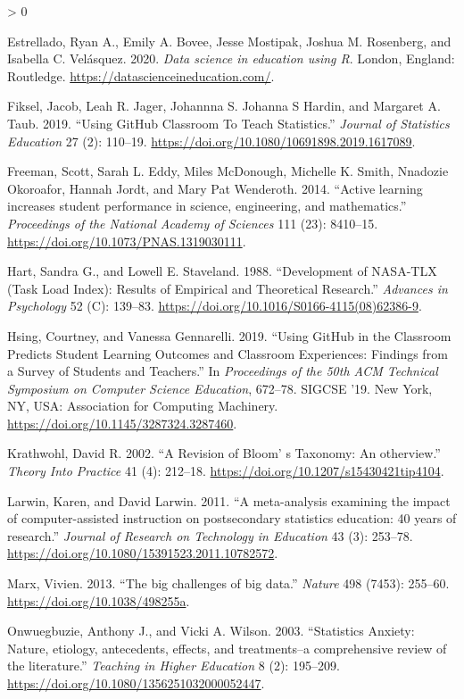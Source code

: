 \documentclass[
]{article}
\newlength{\cslhangindent}
\newenvironment{CSLReferences}[2] %
 {%
  \setlength{\parindent}{0pt}
  \ifodd #1 \everypar{\setlength{\hangindent}{\cslhangindent}}\ignorespaces\fi
  \ifnum #2 > 0
  \setlength{\parskip}{#2\baselineskip}
  \fi
 }%
 {}
\begin{document}
\begin{CSLReferences}{1}{0}
\leavevmode\hypertarget{ref-Estrellado2020}{}%
Estrellado, Ryan A., Emily A. Bovee, Jesse Mostipak, Joshua M.
Rosenberg, and Isabella C. Velásquez. 2020. \emph{{Data science in
education using R}}. London, England: Routledge.
\url{https://datascienceineducation.com/}.

\leavevmode\hypertarget{ref-Fiksel2019}{}%
Fiksel, Jacob, Leah R. Jager, Johannna S. Johanna S Hardin, and Margaret
A. Taub. 2019. {``{Using GitHub Classroom To Teach Statistics}.''}
\emph{Journal of Statistics Education} 27 (2): 110--19.
\url{https://doi.org/10.1080/10691898.2019.1617089}.

\leavevmode\hypertarget{ref-Freeman2014}{}%
Freeman, Scott, Sarah L. Eddy, Miles McDonough, Michelle K. Smith,
Nnadozie Okoroafor, Hannah Jordt, and Mary Pat Wenderoth. 2014.
{``{Active learning increases student performance in science,
engineering, and mathematics}.''} \emph{Proceedings of the National
Academy of Sciences} 111 (23): 8410--15.
\url{https://doi.org/10.1073/PNAS.1319030111}.

\leavevmode\hypertarget{ref-Hart1988}{}%
Hart, Sandra G., and Lowell E. Staveland. 1988. {``{Development of
NASA-TLX (Task Load Index): Results of Empirical and Theoretical
Research}.''} \emph{Advances in Psychology} 52 (C): 139--83.
\url{https://doi.org/10.1016/S0166-4115(08)62386-9}.

\leavevmode\hypertarget{ref-Hsing2019}{}%
Hsing, Courtney, and Vanessa Gennarelli. 2019. {``{Using GitHub in the
Classroom Predicts Student Learning Outcomes and Classroom Experiences:
Findings from a Survey of Students and Teachers}.''} In
\emph{Proceedings of the 50th ACM Technical Symposium on Computer
Science Education}, 672--78. SIGCSE '19. New York, NY, USA: Association
for Computing Machinery. \url{https://doi.org/10.1145/3287324.3287460}.

\leavevmode\hypertarget{ref-Krathwohl2002}{}%
Krathwohl, David R. 2002. {``{A Revision of Bloom' s Taxonomy: An
otherview}.''} \emph{Theory Into Practice} 41 (4): 212--18.
\url{https://doi.org/10.1207/s15430421tip4104}.

\leavevmode\hypertarget{ref-Larwin2011}{}%
Larwin, Karen, and David Larwin. 2011. {``{A meta-analysis examining the
impact of computer-assisted instruction on postsecondary statistics
education: 40 years of research}.''} \emph{Journal of Research on
Technology in Education} 43 (3): 253--78.
\url{https://doi.org/10.1080/15391523.2011.10782572}.

\leavevmode\hypertarget{ref-Marx2013}{}%
Marx, Vivien. 2013. {``{The big challenges of big data}.''}
\emph{Nature} 498 (7453): 255--60.
\url{https://doi.org/10.1038/498255a}.

\leavevmode\hypertarget{ref-Onwuegbuzie2003}{}%
Onwuegbuzie, Anthony J., and Vicki A. Wilson. 2003. {``{Statistics
Anxiety: Nature, etiology, antecedents, effects, and treatments--a
comprehensive review of the literature}.''} \emph{Teaching in Higher
Education} 8 (2): 195--209.
\url{https://doi.org/10.1080/1356251032000052447}.

\end{CSLReferences}
\end{document}
